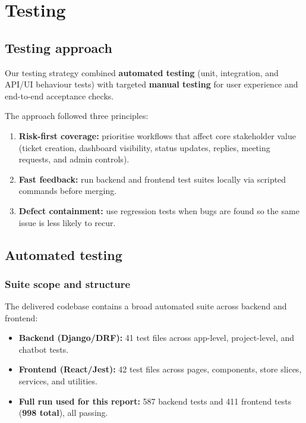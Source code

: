 \chapter{Testing}
\label{chap:testing}

\section{Testing approach}

Our testing strategy combined \textbf{automated testing} (unit, integration, and API/UI behaviour tests) with targeted \textbf{manual testing} for user experience and end-to-end acceptance checks.

The approach followed three principles:
\begin{enumerate}
	\item \textbf{Risk-first coverage:} prioritise workflows that affect core stakeholder value (ticket creation, dashboard visibility, status updates, replies, meeting requests, and admin controls).
	\item \textbf{Fast feedback:} run backend and frontend test suites locally via scripted commands before merging.
	\item \textbf{Defect containment:} use regression tests when bugs are found so the same issue is less likely to recur.
\end{enumerate}

\section{Automated testing}

\subsection{Suite scope and structure}

The delivered codebase contains a broad automated suite across backend and frontend:
\begin{itemize}
	\item \textbf{Backend (Django/DRF):} 41 test files across app-level, project-level, and chatbot tests.
	\item \textbf{Frontend (React/Jest):} 42 test files across pages, components, store slices, services, and utilities.
	\item \textbf{Full run used for this report:} 587 backend tests and 411 frontend tests (\textbf{998 total}), all passing.
\end{itemize}

